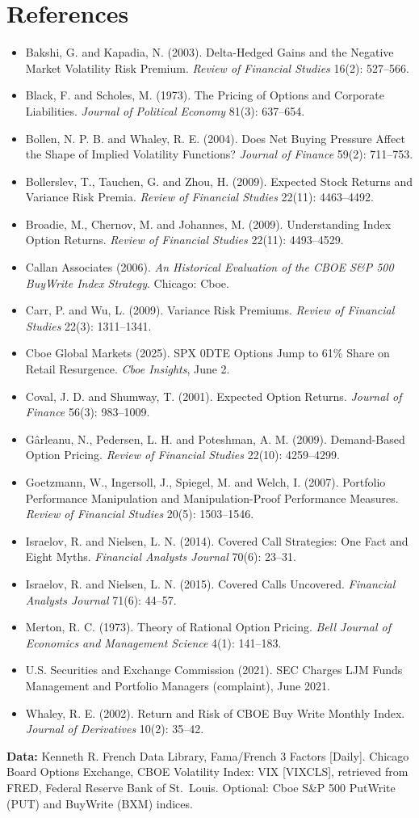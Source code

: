 \section*{References}

\begin{itemize}
  \item Bakshi, G. and Kapadia, N. (2003). Delta-Hedged Gains and the Negative Market Volatility Risk Premium. \emph{Review of Financial Studies} 16(2): 527--566.
  \item Black, F. and Scholes, M. (1973). The Pricing of Options and Corporate Liabilities. \emph{Journal of Political Economy} 81(3): 637--654.
  \item Bollen, N. P. B. and Whaley, R. E. (2004). Does Net Buying Pressure Affect the Shape of Implied Volatility Functions? \emph{Journal of Finance} 59(2): 711--753.
  \item Bollerslev, T., Tauchen, G. and Zhou, H. (2009). Expected Stock Returns and Variance Risk Premia. \emph{Review of Financial Studies} 22(11): 4463--4492.
  \item Broadie, M., Chernov, M. and Johannes, M. (2009). Understanding Index Option Returns. \emph{Review of Financial Studies} 22(11): 4493--4529.
  \item Callan Associates (2006). \emph{An Historical Evaluation of the CBOE S\&P 500 BuyWrite Index Strategy}. Chicago: Cboe.
  \item Carr, P. and Wu, L. (2009). Variance Risk Premiums. \emph{Review of Financial Studies} 22(3): 1311--1341.
  \item Cboe Global Markets (2025). SPX 0DTE Options Jump to 61\% Share on Retail Resurgence. \emph{Cboe Insights}, June 2.
  \item Coval, J. D. and Shumway, T. (2001). Expected Option Returns. \emph{Journal of Finance} 56(3): 983--1009.
  \item G\^arleanu, N., Pedersen, L. H. and Poteshman, A. M. (2009). Demand-Based Option Pricing. \emph{Review of Financial Studies} 22(10): 4259--4299.
  \item Goetzmann, W., Ingersoll, J., Spiegel, M. and Welch, I. (2007). Portfolio Performance Manipulation and Manipulation-Proof Performance Measures. \emph{Review of Financial Studies} 20(5): 1503--1546.
  \item Israelov, R. and Nielsen, L. N. (2014). Covered Call Strategies: One Fact and Eight Myths. \emph{Financial Analysts Journal} 70(6): 23--31.
  \item Israelov, R. and Nielsen, L. N. (2015). Covered Calls Uncovered. \emph{Financial Analysts Journal} 71(6): 44--57.
  \item Merton, R. C. (1973). Theory of Rational Option Pricing. \emph{Bell Journal of Economics and Management Science} 4(1): 141--183.
  \item U.S. Securities and Exchange Commission (2021). SEC Charges LJM Funds Management and Portfolio Managers (complaint), June 2021.
  \item Whaley, R. E. (2002). Return and Risk of CBOE Buy Write Monthly Index. \emph{Journal of Derivatives} 10(2): 35--42.
\end{itemize}

\textbf{Data:} Kenneth R. French Data Library, Fama/French 3 Factors [Daily]. Chicago Board Options Exchange, CBOE Volatility Index: VIX [VIXCLS], retrieved from FRED, Federal Reserve Bank of St.\ Louis. Optional: Cboe S\&P 500 PutWrite (PUT) and BuyWrite (BXM) indices.

